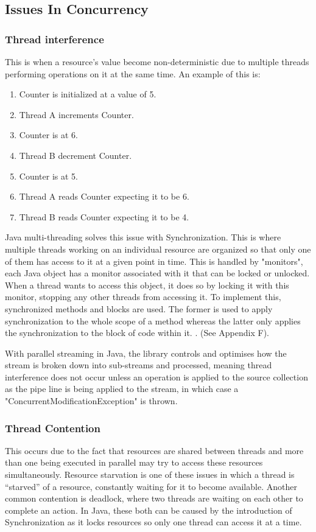 \documentclass[]{report}
\begin{document}
\subsection{Issues In Concurrency}

\subsubsection{Thread interference}
This is when a resource's value become non-deterministic due to multiple threads performing operations on it at the same time\cite{Thread Interference}. An example of this is:

\begin{enumerate}[topsep=0pt,itemsep=-1ex,partopsep=1ex,parsep=1ex]
	\item Counter is initialized at a value of 5.
	\item Thread A increments Counter.
	\item Counter is at 6.
	\item Thread B decrement Counter.
	\item Counter is at 5.
	\item Thread A reads Counter expecting it to be 6.
	\item Thread B reads Counter expecting it to be 4.	
\end{enumerate}

Java multi-threading solves this issue with Synchronization. This is where multiple threads working on an individual resource are organized so that only one of them has access to it at a given point in time. This is handled by "monitors", each Java object has a monitor associated with it that can be locked or unlocked. When a thread wants to access this object, it does so by locking it with this monitor, stopping any other threads from accessing it. To implement this, synchronized methods and blocks are used. The former is used to apply synchronization to the whole scope of a method whereas the latter only applies the synchronization to the block of code within it. \cite{Synchronization}. (See Appendix F).

With parallel streaming in Java, the library controls and optimises how the stream is broken down into sub-streams and processed, meaning thread interference does not occur unless an operation is applied to the source collection as the pipe line is being applied to the stream, in which case a "ConcurrentModificationException" is thrown.\cite{Streaming Fork Join}

\subsubsection{Thread Contention} 
This occurs due to the fact that resources are shared between threads and more than one  being executed in parallel may try to access these resources simultaneously. Resource starvation is one of these issues in which a thread is “starved” of a resource, constantly waiting for it to become available\cite{Starvation}. Another common contention is deadlock, where two threads are waiting on each other to complete an action. In Java, these both can be caused by the introduction of Synchronization as it locks resources so only one thread can access it at a time.\cite{Synchronization}
\end{document}

